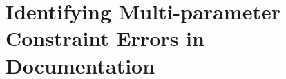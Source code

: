 
\chapter{Identifying Multi-parameter Constraint Errors in Documentation} %
\label{ch:chapter5}








% 